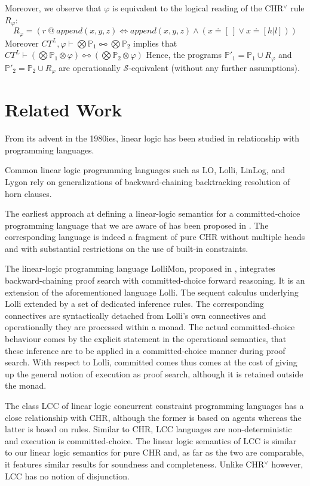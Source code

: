 \documentclass[acmtocl]{acmtrans2m}
\newcommand{\bbP}{\ensuremath{\mathbb{P}}}
\newcommand{\cS}{\ensuremath{\mathcal{S}}}
\newcommand{\lpl}{\multimapboth}
\begin{document}
\begin{example}
Moreover, we observe that $\varphi$ is equivalent to the logical reading of the
CHR$^\vee$ rule $R_\varphi$: \[ R_\varphi = ( r\ @\ append(x,y,z) \Leftrightarrow
append(x,y,z) \wedge (x\doteq[~] \vee x\doteq[h|l]) ) \] Moreover
$CT^L,\varphi\vdash\bigotimes\bbP_1\lpl\bigotimes\bbP_2$ implies that
$CT^L\vdash(\bigotimes\bbP_1\otimes\varphi)\lpl(\bigotimes\bbP_2\otimes\varphi)$
Hence, the programs $\bbP'_1=\bbP_1\cup R_\varphi$ and $\bbP'_2=\bbP_2\cup
R_\varphi$ are operationally $\cS$-equivalent (without any further assumptions).
\end{example}

\section{Related Work}
\label{sec:related}

From its advent in the 1980ies, linear logic has been studied in relationship
with programming languages.

Common linear logic programming languages such as
LO\cite{DBLP:conf/oopsla/AndreoliP90}, Lolli\cite{DBLP:conf/lics/HodasM91},
LinLog\cite{Andreoli92logicprogramming}, and
Lygon\cite{DBLP:conf/amast/HarlandPW96} rely on generalizations of
backward-chaining backtracking resolution of horn clauses.

The earliest approach at defining a linear-logic semantics for a
committed-choice programming language that we are aware of has been proposed in
\cite{DBLP:conf/kgc/Zlatuska93}. The corresponding language is indeed a fragment
of pure CHR without multiple heads and with substantial restrictions on the use
of built-in constraints.

The linear-logic programming language LolliMon, proposed in
\cite{DBLP:conf/ppdp/LopezPPW05}, integrates backward-chaining proof search with
committed-choice forward reasoning. It is an extension of the aforementioned
language Lolli. The sequent calculus underlying Lolli extended by a set of
dedicated inference rules. The corresponding connectives are syntactically
detached from Lolli's own connectives and operationally they are processed within
a monad. The actual committed-choice behaviour comes by the explicit statement in
the operational semantics, that these inference are to be applied in a
committed-choice manner during proof search. With respect to Lolli, committed
comes thus comes at the cost of giving up the general notion of execution as
proof search, although it is retained outside the monad.

The class LCC of linear logic concurrent constraint programming languages
\cite{DBLP:journals/iandc/FagesRS01} has a close relationship with CHR, although
the former is based on agents whereas the latter is based on rules. Similar to
CHR, LCC languages are non-deterministic and execution is committed-choice. The
linear logic semantics of LCC is similar to our linear logic semantics for pure
CHR and, as far as the two are comparable, it features similar results for
soundness and completeness. Unlike CHR$^\vee$ however, LCC has no notion of
disjunction.
\end{document}

